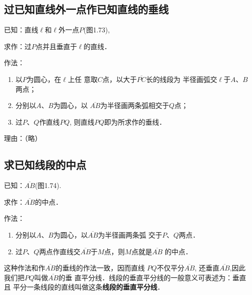 \subsection{过已知直线外一点作已知直线的垂线}
已知：直线$\ell$和$\ell$外一点$P$(图1.73),

求作：过$P$点并且垂直于$\ell$的直线．

作法：
\begin{enumerate}
\item 以$P$为圆心，在$\ell$上任
意取$C$点，以大于$\overline{PC}$长的线段为
半径画弧交$\ell$于$A$、$B$两点；
\item 分别以$A$、$B$为圆心，以
$\overline{AB}$为半径画两条弧相交于$Q$点；
\item 过$P$、$Q$作直线$PQ$, 则直线$PQ$即为所求作的垂线．
\end{enumerate}

理由：（略）

\subsection{求已知线段的中点}

已知：$\overline{AB}$(图1.74).

求作：$\overline{AB}$的中点．

作法：
\begin{enumerate}
\item 分别以$A$、$B$为圆心，以$\overline{AB}$为半径画两条弧
交于$P$、$Q$两点．
\item 过$P$、$Q$两点作直线交$\overline{AB}$于$M$点，则$M$点就是$\overline{AB}$
的中点．
\end{enumerate}

\begin{rmk}
	这种作法和作$\overline{AB}$的垂线的作法一致，因而直线
	$PQ$不仅平分$\overline{AB}$, 还垂直$\overline{AB}$,因此我们把$PQ$叫做$\overline{AB}$的垂
直平分线．线段的垂直平分线的一般意义可表述为：垂直且
平分一条线段的直线叫做这条\textbf{线段的垂直平分线}．
\end{rmk}

